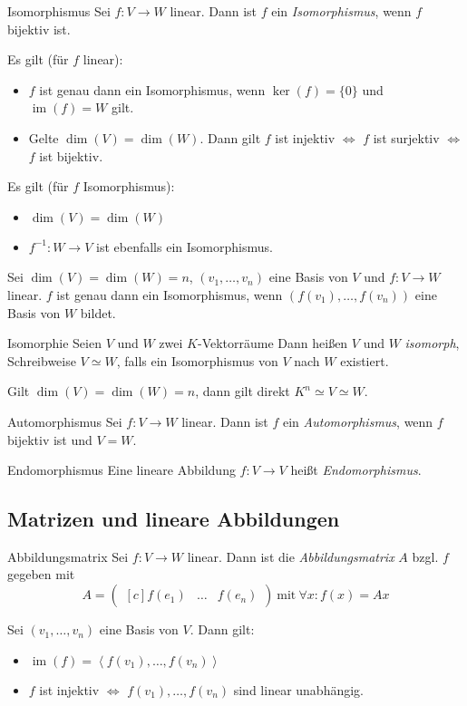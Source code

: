 \documentclass[german]{../spicker}
\newcommand{\scalarprod}[1]{\left\langle #1 \right\rangle}
\newcommand{\vektor}[1]{\begin{pmatrix*}[c] #1 \end{pmatrix*}}
\newcommand{\im}{\operatorname{im}}
\begin{document}
\begin{defi}{Isomorphismus}
    Sei $f : V \to W$ linear.
    Dann ist $f$ ein \emph{Isomorphismus}, wenn $f$ bijektiv ist.

    Es gilt (für $f$ linear):
    \begin{itemize}
        \item $f$ ist genau dann ein Isomorphismus, wenn $\ker(f) = \{0\}$ und $\im(f) = W$ gilt.
        \item Gelte $\dim (V) = \dim (W)$. Dann gilt $f$ ist injektiv $\iff$ $f$ ist surjektiv $\iff$ $f$ ist bijektiv.
    \end{itemize}

    Es gilt (für $f$ Isomorphismus):
    \begin{itemize}
        \item $\dim(V) = \dim(W)$
        \item $f^{-1} : W \to V$ ist ebenfalls ein Isomorphismus.
    \end{itemize}

    Sei $\dim(V) = \dim(W) = n$, $(v_1, \ldots, v_n)$ eine Basis von $V$ und $f : V \to W$ linear.
    $f$ ist genau dann ein Isomorphismus, wenn $(f(v_1), \ldots, f(v_n))$ eine Basis von $W$ bildet.
\end{defi}

\begin{bonus}{Isomorphie}
    Seien $V$ und $W$ zwei $K$-Vektorräume
    Dann heißen $V$ und $W$ \emph{isomorph}, Schreibweise $V \simeq W$, falls ein Isomorphismus von $V$ nach $W$ existiert.

    Gilt $\dim(V) = \dim(W) = n$, dann gilt direkt $K^n \simeq V \simeq W$.
\end{bonus}

\begin{defi}{Automorphismus}
    Sei $f : V \to W$ linear.
    Dann ist $f$ ein \emph{Automorphismus}, wenn $f$ bijektiv ist und $V = W$.
\end{defi}

\begin{defi}{Endomorphismus}
    Eine lineare Abbildung $f : V \to V$ heißt \emph{Endomorphismus}.
\end{defi}

\subsection{Matrizen und lineare Abbildungen}

\begin{defi}{Abbildungsmatrix}
    Sei $f : V \to W$ linear. Dann ist die \emph{Abbildungsmatrix} $A$ bzgl. $f$ gegeben mit
    $$
        A = \vektor{f(e_1) & \ldots & f(e_n)} \ \text{mit} \ \forall x : f(x) = Ax
    $$

    Sei $(v_1, \ldots, v_n)$ eine Basis von $V$. Dann gilt:
    \begin{itemize}
        \item $\im(f) = \scalarprod{f(v_1), \ldots, f(v_n)}$
        \item $f$ ist injektiv $\iff$ $f(v_1), \ldots, f(v_n)$ sind linear unabhängig.
    \end{itemize}
\end{defi}
\end{document}
